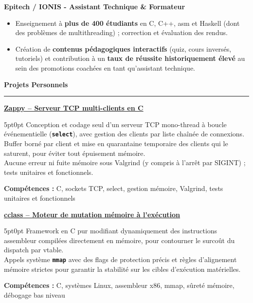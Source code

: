 \documentclass[9pt]{extarticle}
\begin{document}
\par\vspace{5pt}

{\bfseries Epitech / IONIS - Assistant Technique \& Formateur}
\begin{itemize}[noitemsep, topsep=0pt]
	\item Enseignement à {\bfseries plus de 400 étudiants} en C, C++, asm et Haskell (dont des problèmes de multithreading) ; correction et évaluation des rendus.
	\item Création de {\bfseries contenus pédagogiques interactifs} (quiz, cours inversés, tutoriels) et contribution à un {\bfseries taux de réussite historiquement élevé} au sein des promotions coachées en tant qu'assistant technique.
\end{itemize}

\par\vspace{5pt}


{\large\bfseries Projets Personnels}
\par\vspace{-8pt}
\rule{\linewidth}{0.4pt}
\par\vspace{5pt}

\underline{\bfseries Zappy -- Serveur TCP multi-clients en C}
\par
\begin{adjustwidth}{5pt}{0pt}
    Conception et codage seul d'un serveur TCP mono-thread à boucle événementielle ({\bfseries \texttt{select}}), avec gestion des clients par liste chaînée de connexions. \\
    Buffer borné par client et mise en quarantaine temporaire des clients qui le saturent, pour éviter tout épuisement mémoire. \\
    Aucune erreur ni fuite mémoire sous Valgrind (y compris à l'arrêt par SIGINT) ; tests unitaires et fonctionnels.
\end{adjustwidth}
\par
{\bfseries Compétences :} C, sockets TCP, select, gestion mémoire, Valgrind, tests unitaires et fonctionnels

\par\vspace{8pt}

\underline{\bfseries \href{https://github.com/paulogarithm/cclass}{cclass} -- Moteur de mutation mémoire à l'exécution}
\par
\begin{adjustwidth}{5pt}{0pt}
    Framework en C pur modifiant dynamiquement des instructions assembleur compilées directement en mémoire, pour contourner le surcoût du dispatch par vtable. \\
    Appels système {\bfseries \texttt{mmap}} avec des flags de protection précis et règles d'alignement mémoire strictes pour garantir la stabilité sur les cibles d'exécution matérielles.
\end{adjustwidth}
\par
{\bfseries Compétences :} C, systèmes Linux, assembleur x86, mmap, sûreté mémoire, débogage bas niveau
\end{document}
